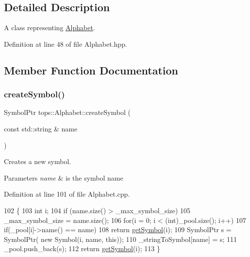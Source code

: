 \subsection{Detailed Description}
A class representing \hyperlink{classtops_1_1Alphabet}{Alphabet}. 

Definition at line 48 of file Alphabet.\+hpp.



\subsection{Member Function Documentation}
\mbox{\label{classtops_1_1Alphabet_ae82947c05a15225d90a93547d26c10b0}} 
\subsubsection{\texorpdfstring{create\+Symbol()}{createSymbol()}}
{\footnotesize\ttfamily Symbol\+Ptr tops\+::\+Alphabet\+::create\+Symbol (\begin{DoxyParamCaption}\item[{const std\+::string \&}]{name }\end{DoxyParamCaption})}



Creates a new symbol. 


\begin{DoxyParams}{Parameters}
{\em name} & is the symbol name \\
\hline
\end{DoxyParams}


Definition at line 101 of file Alphabet.\+cpp.


\begin{DoxyCode}
102   \{
103     \textcolor{keywordtype}{int} i;
104     \textcolor{keywordflow}{if} (name.size() > \_max\_symbol\_size) 
105       \_max\_symbol\_size = name.size();
106     \textcolor{keywordflow}{for}(i = 0; i < (int)\_pool.size(); i++)
107       \textcolor{keywordflow}{if}(\_pool[i]->name() == name)
108         \textcolor{keywordflow}{return} \hyperlink{classtops_1_1Alphabet_ada9bbe4368c00ca714b99ba49bd9d350}{getSymbol}(i);
109     SymbolPtr s = SymbolPtr( \textcolor{keyword}{new} Symbol(i, name, \textcolor{keyword}{this}));
110     \_stringToSymbol[name] = s;
111     \_pool.push\_back(s);
112     \textcolor{keywordflow}{return} \hyperlink{classtops_1_1Alphabet_ada9bbe4368c00ca714b99ba49bd9d350}{getSymbol}(i);
113   \}
\end{DoxyCode}
\mbox{\label{classtops_1_1Alphabet_af41f8fcef3a5e540a8af63afc85df668}} 
